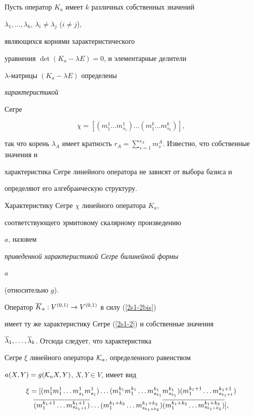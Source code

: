 Пусть оператор $K_a$ имеет $k$ различных собственных значений


$\lambda_1,\dotsc,\lambda_k$, $\lambda_i \ne \lambda_j$ ($i\ne j$),


являющихся корнями характеристического


уравнения $\det (K_a -\lambda E) =0$, и элементарные делители


$\lambda$-матрицы $(K_a-\lambda E)$ определены {\it характеристикой


Сегре} \cite{shir2}


\begin{equation}


\label{2s1-2}


\chi = [(m^1_1\dotsc m^1_{s_1})\dotsc(m^k_1 \dotsc m^k_{s_k})],


\end{equation}


так что корень $\lambda_A$ имеет кратность $r_A =


\sum\limits_{s=1}^{s_A} m_s^A$. Известно, что собственные значения и


характеристика Сегре линейного оператора не зависят от выбора базиса и


определяют его алгебраическую структуру.





Характеристику Сегре $\chi$ линейного оператора $K_a$,


соответствующего эрмитовому скалярному произведению


$a$, назовем {\it приведенной характеристикой Сегре билинейной формы


$a$} (относительно $g$).





Оператор $\overline K_a: V^{(0,1)}\to V^{(0,1)}$ в силу (\ref{2s1-2bis})


имеет ту же характеристику Сегре (\ref{2s1-2}) и собственные значения


$\overline\lambda_1,\dotsc,\overline\lambda_k$. Отсюда следует, что характеристика


Сегре $\xi$ линейного оператора ${\cal K}_a$, определенного равенством


$a(X,Y)=g({\cal K}_a X,Y)$, $X,Y\in V$, имеет вид


\begin{multline*}


\xi = [(m^1_1 m^1_1\dotsc m^1_{s_1} m^1_{s_1})\dotsc


(m^{k_1}_1 m^{k_1}_1\dotsc m^{k_1}_{s_{k_1}} m^{k_1}_{s_{k_1}})


(m^{k_1+1}_1 \dotsc m^{k_1+1}_{s_{k_1+1}}) \\


%


\ol{(m^{k_1+1}_1 \dotsc m^{k_1+1}_{s_{k_1+1}})}\dotsc


(m^{k_1+k_2}_1 \dotsc m^{k_1+k_2}_{s_{k_1+k_2}})


\ol{(m^{k_1+k_2}_1 \dotsc m^{k_1+k_2}_{s_{k_1+k_2}})}],


\end{multline*}


